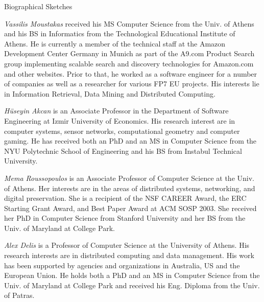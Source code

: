\documentclass[10pt,letterpaper]{article}
\begin{document}
\vspace*{0.5cm}
\centerline{\large \sf Biographical Sketches}
\vspace*{0.5cm}
\vspace*{0.5cm}

\emph{Vassilis Moustakas} received his MS Computer Science from the Univ. of Athens and his BS in Informatics from the Technological Educational Institute of Athens.  He is currently a member of the technical staff at the Amazon Development Center Germany in Munich as part of the A9.com Product Search group implementing scalable search and discovery technologies for Amazon.com and other websites. Prior to that, he worked as a software engineer for a number of companies as well as a researcher for various FP7 EU projects. His interests lie in Information Retrieval, Data Mining and Distributed Computing.

\emph{H\"useyin Akcan} is an Associate Professor in the Department of Software Engineering at Izmir University of Economics. His research interest are in computer systems, sensor networks, computational geometry and computer gaming. He has received both an PhD and an MS in Computer Science from the NYU Polytechnic School of Engineering and his BS from Instabul Technical University.

\emph{Mema Roussopoulos}  is an Associate Professor of Computer Science at the Univ. of Athens. Her interests  are  in  the  areas  of  distributed systems, networking, and digital preservation. She is a recipient of the NSF CAREER Award, the ERC Starting Grant Award, and Best Paper Award at ACM SOSP 2003.  She received her PhD in Computer Science from Stanford University and her BS from the Univ. of Maryland at College Park.

\emph{Alex Delis} is a Professor of Computer Science at the University of Athens. His research interests are in distributed computing and data management.  His work has been supported by agencies and organizations in Australia, US and the European Union. He holds both a PhD and an MS in Computer Science from the Univ. of Maryland at College Park and received his Eng. Diploma from the Univ. of Patras. 
\end{document}
